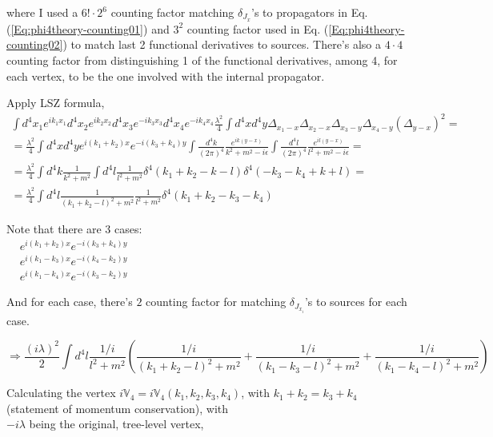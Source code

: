 \documentclass[twoside]{amsart}
\begin{document}
where I used a $6! \cdot 2^6$ counting factor matching $\delta_{J_x}$'s to propagators in Eq. (\ref{Eq:phi4theory-counting01}) and $3^2$ counting factor used in Eq. (\ref{Eq:phi4theory-counting02}) to match last 2 functional derivatives to sources.  There's also a $4 \cdot 4$ counting factor from distinguishing 1 of the functional derivatives, among 4, for each vertex, to be the one involved with the internal propagator.  

Apply LSZ formula,
\[
\begin{gathered}
  \int d^4x_1 e^{ik_1x_1}  d^4x_2 e^{ik_2x_2}  d^4x_3 e^{-ik_3x_3}  d^4x_4 e^{-ik_4x_4} \frac{ \lambda^2}{ 4} \int d^4x d^4y \Delta_{x_1 -x}  \Delta_{x_2 -x}  \Delta_{x_3 -y}  \Delta_{x_4 -y} ( \Delta_{y-x} )^2 = \\
  = \frac{ \lambda^2}{ 4 } \int d^4x d^4y e^{ i (k_1 + k_2)x} e^{-i (k_3 + k_4)y } \int \frac{ d^4k}{(2\pi)^4} \frac{ e^{ik (y-x) }}{ k^2 + m^2 - i\epsilon } \int \frac{ d^4l}{(2\pi)^4} \frac{ e^{il (y-x) }}{ l^2 + m^2 - i\epsilon } = \\
  = \frac{ \lambda^2 }{4} \int d^4k \frac{ 1 }{ k^2 + m^2} \int d^4l \frac{1}{ l^2 + m^2 } \delta^4(k_1 + k_2 - k - l) \delta^4(-k_3 -k_4 + k+ l ) = \\ 
  = \frac{ \lambda^2 }{ 4 } \int d^4l \frac{ 1}{  ( k_1 + k_2 - l)^2 + m^2 } \frac{1}{ l^2 + m^2 } \delta^4(k_1 + k_2 - k_3 -k_4)
\end{gathered}
\]

Note that there are 3 cases:  \\
$\begin{aligned}
  & e^{i (k_1 + k_2)x}    e^{-i (k_3 + k_4)y}  \\
  & e^{i (k_1 - k_3)x}    e^{-i (k_4 - k_2)y}  \\
  & e^{i (k_1 - k_4)x}    e^{-i (k_3 - k_2)y}  
\end{aligned}$

And for each case, there's $2$ counting factor for matching $\delta_{J_{x_i}}$'s to sources for each case.   

\[
\Longrightarrow \frac{ (i \lambda)^2 }{ 2 } \int d^4l \frac{ 1/i}{ l^2 +  m^2 } \left( \frac{ 1 /i }{ (k_1 + k_2 - l)^2 + m^2 } + \frac{ 1 /i }{ (k_1 - k_3 - l)^2 + m^2 }  + \frac{ 1 /i }{ (k_1 - k_4 - l)^2 + m^2 }  \right) 
\]

\hrulefill

Calculating the vertex $i \mathbb{V}_4 = i \mathbb{V}_4(k_1,k_2,k_3,k_4)$, with $k_1 + k_2 = k_3 + k_4$ (statement of momentum conservation), with \\
$-i \lambda$ being the original, tree-level vertex,
\end{document}
